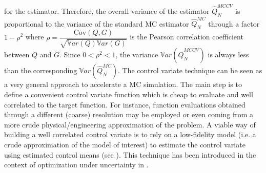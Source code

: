 for the estimator. Therefore, the overall variance of the estimator $\hat{Q}_N^{MCCV}$ is proportional to the variance of the standard
MC estimator $\hat{Q}_N^{MC}$ through a factor $1-\rho^2$ where $\rho = \dfrac{ \mathrm{Cov}\left(Q,G\right) }{\sqrt{\mathbb{V}ar\left(Q\right)\mathbb{V}ar\left(G\right)}}$ is the Pearson
correlation coefficient between $Q$ and $G$. Since $0<\rho^2<1$, the variance $\mathbb{V}ar\left( \hat{Q}_N^{MCCV} \right)$ is always less than
the corresponding $\mathbb{V}ar\left({\hat{Q}_N^{MC}}\right)$. The control variate technique can be seen as a very general approach
to accelerate a MC simulation. The main step is to define a convenient control variate function which is cheap to evaluate and well correlated 
to the target function. For instance, function evaluations obtained through a different (coarse) resolution may be employed or even coming 
from a more crude physical/engineering approximation of the problem. A viable way of building a well correlated control variate is to 
rely on a low-fidelity model (i.e. a crude approximation of the model of interest) to estimate the control variate using estimated 
control means (see \cite{Pasupathy2014}). This technique has been introduced in the context of optimization under uncertainty in \cite{Ng2014}.

